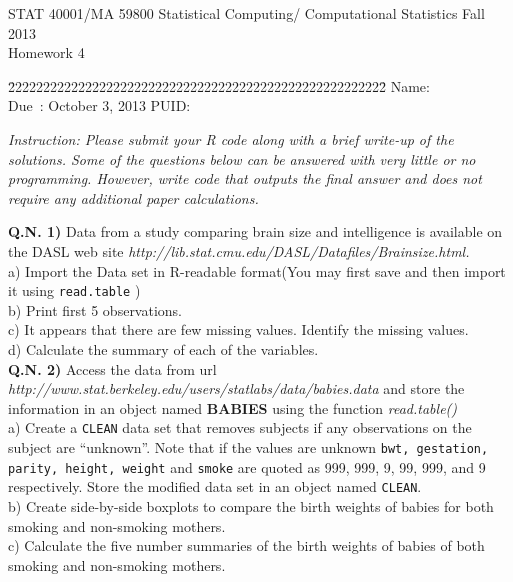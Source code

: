 \documentclass[twoside,11pt,,a4paper]{report}
\begin{document}
\begin{center}
\begin{bf}
{\large  STAT 40001/MA 59800 \hspace{0.11in}  Statistical Computing/ Computational Statistics\hspace{ 0.1in} Fall 2013\\ Homework 4} \\
\end{bf}
\end{center}

\begin{tabbing}
             \= 222222222222222222222222222222222222222222222222222222\= \kill
            \>             \>  Name:     \\
            \>  Due \,: October 3, 2013                         \> PUID:
    \end{tabbing}
   \emph{ Instruction: Please submit your R code along with a brief write-up of the
solutions. Some of the questions below can be answered with very little or no programming. However, write code that outputs the final answer and does not require any additional paper
calculations. \\}

\noindent \textbf{ Q.N. 1)} Data from a study comparing brain size and intelligence is available on the DASL web site \textit{http://lib.stat.cmu.edu/DASL/Datafiles/Brainsize.html.} \\
a) Import the Data set in R-readable format(You may  first save and then import it using \verb"read.table" )\\
b) Print first 5 observations.\\
c) It appears that there are few missing values. Identify the missing values.\\
d) Calculate the summary of each of the variables.\\


\noindent \textbf{ Q.N. 2)} Access the data from url
\textit{http://www.stat.berkeley.edu/users/statlabs/data/babies.data} and store the information in an object named \textbf{BABIES} using the function \emph{read.table()}\\
a) Create a \verb"CLEAN" data set that removes subjects if any observations on the subject are ``unknown''. Note that  if the values are unknown \verb"bwt, gestation, parity, height, weight" and \verb"smoke" are quoted as  999, 999, 9, 99, 999, and 9 respectively. Store the modified data set in an object named \verb"CLEAN".\\
b) Create side-by-side boxplots to compare the birth weights of babies for both smoking and non-smoking mothers.\\
c) Calculate the five number summaries of  the birth weights of babies of both smoking and non-smoking mothers.\\
\end{document}

